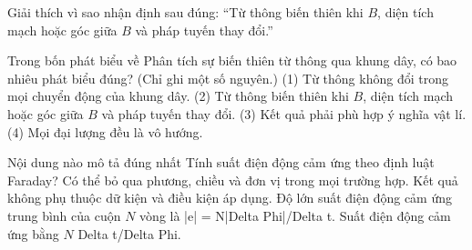 \begin{bt}
Giải thích vì sao nhận định sau đúng: “Từ thông biến thiên khi $B$, diện tích mạch hoặc góc giữa $B$ và pháp tuyến thay đổi.”
\end{bt}

\begin{ex}
Trong bốn phát biểu về Phân tích sự biến thiên từ thông qua khung dây, có bao nhiêu phát biểu đúng? (Chỉ ghi một số nguyên.) (1) Từ thông không đổi trong mọi chuyển động của khung dây. (2) Từ thông biến thiên khi $B$, diện tích mạch hoặc góc giữa $B$ và pháp tuyến thay đổi. (3) Kết quả phải phù hợp ý nghĩa vật lí. (4) Mọi đại lượng đều là vô hướng.
\end{ex}

\begin{ex}
Nội dung nào mô tả đúng nhất Tính suất điện động cảm ứng theo định luật Faraday?
\choice
{Có thể bỏ qua phương, chiều và đơn vị trong mọi trường hợp.}
{Kết quả không phụ thuộc dữ kiện và điều kiện áp dụng.}
{\True Độ lớn suất điện động cảm ứng trung bình của cuộn $N$ vòng là |e| = N|Delta Phi|/Delta t.}
{Suất điện động cảm ứng bằng $N$ Delta t/Delta Phi.}
\end{ex}

